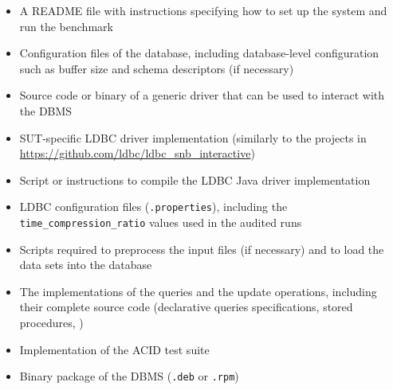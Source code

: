 \begin{itemize}
    \item A README file with instructions specifying how to set up the system and run the benchmark
    \item Configuration files of the database, including database-level configuration such as buffer size and schema descriptors (if necessary)
    \item Source code or binary of a generic driver that can be used to interact with the DBMS
    \item SUT-specific LDBC driver implementation (similarly to the projects in \url{https://github.com/ldbc/ldbc_snb_interactive})
    \item Script or instructions to compile the LDBC Java driver implementation
    \item LDBC configuration files (\texttt{.properties}), including the \texttt{time\_compression\_ratio} values used in the audited runs
    \item Scripts required to preprocess the input files (if necessary) and to load the data sets into the database
    \item The implementations of the queries and the update operations, including their complete source code (\eg declarative queries specifications, stored procedures, \etc)
    \item Implementation of the ACID test suite
    \item Binary package of the DBMS (\eg \texttt{.deb} or \texttt{.rpm})
\end{itemize}
